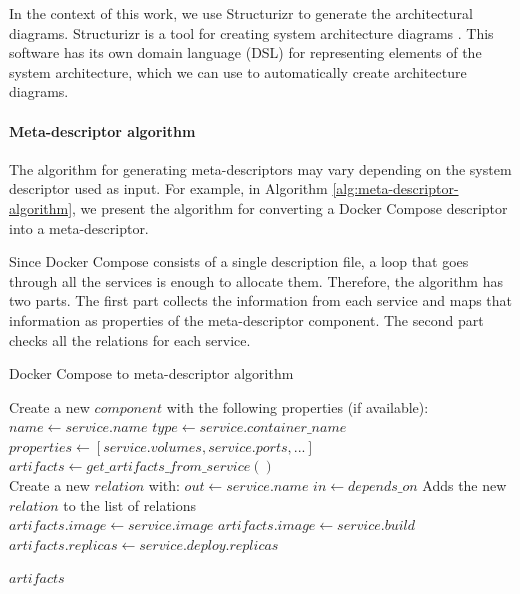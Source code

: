 \documentclass[sigconf]{acmart}
\begin{document}
In the context of this work, we use Structurizr to generate the architectural diagrams. Structurizr is a tool for creating system architecture diagrams \cite{brown2022}. This software has its own domain language (DSL) for representing elements of the system architecture, which we can use to automatically create architecture diagrams.

\paragraph{\textbf{Meta-descriptor algorithm}} The algorithm for generating meta-descriptors may vary depending on the system descriptor used as input. For example, in Algorithm \ref{alg:meta-descriptor-algorithm}, we present the algorithm for converting a Docker Compose descriptor into a meta-descriptor.

Since Docker Compose consists of a single description file, a loop that goes through all the services is enough to allocate them. Therefore, the algorithm has two parts. The first part collects the information from each service and maps that information as properties of the meta-descriptor component. The second part checks all the relations for each service.

\begin{algorithm}
  \scriptsize
\caption{Docker Compose to meta-descriptor algorithm}\label{alg:meta-descriptor-algorithm}
\begin{algorithmic}
    \State Create a new $component$ with the following properties (if available): 
    \State $name \gets service.name$
    \State $type \gets service.container\_name$
    \State $properties \gets [service.volumes, service.ports, ...]$
    \State $artifacts \gets get\_artifacts\_from\_service()$ \\
    
     
        \State Create a new $relation$ with:
        \State  $out \gets service.name$
        \state  $in \gets depends\_on$ 
        \State Adds the new $relation$ to the list of relations
    \EndFor
\EndFor \\

        \State $artifacts.image \gets service.image$
        \State $artifacts.image \gets service.build$
    \EndIf
        \State $artifacts.replicas \gets service.deploy.replicas$
    \EndIf
    
  \State \Return $artifacts$
\EndFunction
    
\end{algorithmic}
\end{algorithm}
\end{document}
